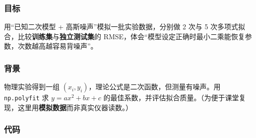 \subsubsection{目标}\label{ux76eeux6807-10}

用``已知二次模型 + 高斯噪声''模拟一批实验数据，分别做 2 次与 5
次多项式拟合，比较\textbf{训练集}与\textbf{独立测试集}的
RMSE，体会``模型设定正确时最小二乘能恢复参数，次数越高越容易背噪声''。

\subsubsection{背景}\label{ux80ccux666f-1}

物理实验得到一组 \((x_i, y_i)\)，理论公式是二次函数，但测量有噪声。用
\texttt{np.polyfit} 求 \(y = a x^2 + b x + c\)
的最佳系数，并评估拟合质量。（为便于课堂复现，这里用\textbf{模拟数据}而非真实仪器读数。）

\subsubsection{代码}\label{ux4ee3ux7801-10}

